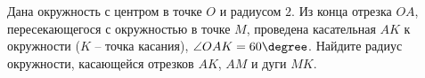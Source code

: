 \begin{ex}
	\begin{condition}
		Дана окружность с центром в точке \( O  \) и радиусом \( 2 \). Из конца отрезка \( OA \), пересекающегося с окружностью в точке \( M \), проведена касательная \( AK  \) к окружности (\( K \) – точка касания), \( \angle OAK = 60\degree \). Найдите радиус окружности, касающейся отрезков \( AK \), \( AM  \) и дуги \( MK \).
	\end{condition}
\end{ex}